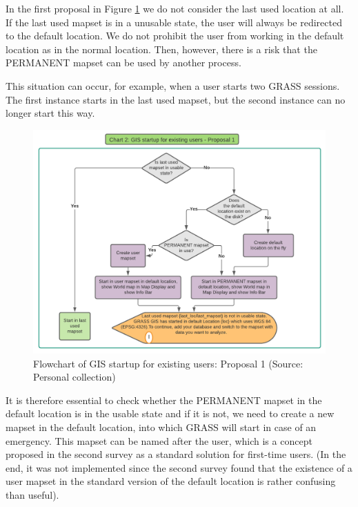 \documentclass[a4paper,10pt,twoside]{article}
\begin{document}
In the first proposal in Figure \ref{fig:normal_user_diagram} we do
not consider the last used location at all. If the last used mapset is
in a unusable state, the user will always be redirected to the
default location. We do not prohibit the user from working in the
default location as in the normal location. Then, however, there is a
risk that the PERMANENT mapset can be used by another process. 

\newpage
\noindent This situation can occur, for example, when a user starts two GRASS
sessions. The first instance starts in the last used mapset, but the
second instance can no longer start this way.

\vspace{0.3cm}
\begin{figure}[hbt!] 
\begin{center}
\includegraphics[width=16.5cm]{../pictures/normal_user_diagram.png} 
\caption[Flowchart of GIS startup for existing users: Proposal 1]{Flowchart of GIS startup for existing users: Proposal 1 (Source: Personal collection)}
\label{fig:normal_user_diagram}
\end{center}
\end{figure}

\noindent It is therefore essential to check whether the PERMANENT
mapset in the default location is in the usable state and if it is
not, we need to create a new mapset in the default location, into
which GRASS will start in case of an emergency. This mapset can be named
after the user, which is a concept proposed in the second survey as a
standard solution for first-time users. (In the end, it was not
implemented since the second survey found that the existence of a user
mapset in the standard version of the default location is rather
confusing than useful).
\end{document}
